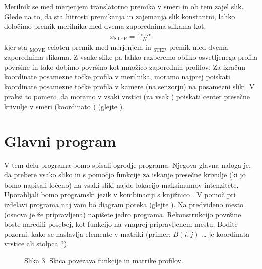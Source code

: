 \documentclass[letterpaper,10pt,english]{sphinxmanual}
\begin{document}
\sphinxAtStartPar
Merilnik se med merjenjem translatorno premika v  smeri in ob tem zajel  slik. Glede na to, da sta
hitrosti premikanja in zajemanja slik konstantni, lahko določimo premik merilnika med dvema
zaporednima slikama kot:
\begin{equation*}
\begin{split}x_{\text{STEP}} = \frac{ x_{\text{MOVE}}}{N}\end{split}
\end{equation*}
\sphinxAtStartPar
kjer sta $_{\text{MOVE}}$ celoten premik med merjenjem in $_{\text{STEP}}$ premik med dvema zaporednima slikama. Z vsake slike pa lahko razberemo obliko osvetljenega profila površine in tako dobimo površino kot množico zaporednih profilov.
Za izračun koordinate posamezne točke profila v  merilnika, moramo najprej poiskati koordinate
posamezne točke profila v  kamere (na senzorju) na posamezni sliki. V praksi to pomeni, da moramo
v vsaki vrstici (za vsak ) poiskati center presečne krivulje v smeri  (koordinato ) (glejte ).


\section{Glavni program}
\label{\detokenize{laserskiprofilomer:glavni-program}}
\sphinxAtStartPar
V tem delu programa bomo spisali ogrodje programa. Njegova glavna naloga je, da prebere vsako sliko
in s pomočjo funkcije za iskanje presečne krivulje (ki jo bomo napisali ločeno) na vsaki sliki najde
lokacijo maksimumov intenzitete.
Uporabljali bomo programski jezik  v kombinaciji s knjižnico . V pomoč pri izdelavi
programa naj vam bo diagram poteka (glejte ). Na predvideno mesto (osnova je že
pripravljena) napišete jedro programa. Rekonstrukcijo površine boste naredili posebej, kot funkcijo na
vnaprej pripravljenem mestu. Bodite pozorni, kako se naslavlja elemente v matriki (primer: \(B(i,j)\)  … je 
koordinata vrstice ali stolpca ?).

\begin{figure}[htbp]
\centering
\capstart

\noindent{}
\caption{Slika 3. Skica povezava funkcije  in matrike profilov.}\label{\detokenize{laserskiprofilomer:id3}}\end{figure}
\end{document}
